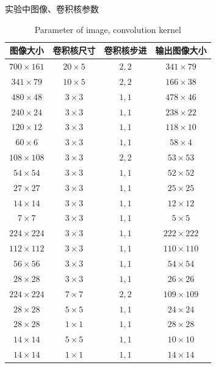 \begin{table}
	\centering
	\renewcommand{\thetable}{\arabic{section}-\arabic{table} }
	\renewcommand{\tablename}{表}
	\caption{实验中图像、卷积核参数}
	\addtocounter{table}{-1}
	\renewcommand{\thetable}{\arabic{section}-\arabic{table} }
	\renewcommand{\tablename}{Table}
	\caption{Parameter of image, convolution kernel}
	\begin{tabular}{cccc}
		\toprule
		图像大小 & 卷积核尺寸 & 卷积核步进 & 输出图像大小 \\
		\midrule
		$ 700\times 161 $ & $ 20\times 5 $ & $ 2,2 $ & $ 341\times 79 $ \\
		$ 341\times 79 $ & $ 10\times 5 $ & $ 2,2 $ & $ 166\times 38 $ \\
		$ 480\times 48 $ & $ 3\times 3 $ & $ 1,1 $ & $ 478\times 46 $ \\
		$ 240\times 24 $ & $ 3\times 3 $ & $ 1,1 $ & $ 238\times 22 $ \\
		$ 120\times 12 $ & $ 3\times 3 $ & $ 1,1 $ & $ 118\times 10 $ \\
		$ 60\times 6 $ & $ 3\times 3 $ & $ 1,1 $ & $ 58\times 4 $ \\
		$ 108\times 108 $ & $ 3\times 3 $ & $ 2,2 $ & $ 53\times 53 $ \\
		$ 54\times 54 $ & $ 3\times 3 $ & $ 1,1 $ & $ 52\times 52 $ \\
		$ 27\times 27 $ & $ 3\times 3 $ & $ 1,1 $ & $ 25\times 25 $ \\
		$ 14\times 14 $ & $ 3\times 3 $ & $ 1,1 $ & $ 12\times 12 $ \\
		$ 7\times 7 $ & $ 3\times 3 $ & $ 1,1 $ & $ 5\times 5 $ \\
		$ 224\times 224 $ & $ 3\times 3 $ & $ 1,1 $ & $ 222\times 222 $ \\
		$ 112\times 112 $ & $ 3\times 3 $ & $ 1,1 $ & $ 110\times 110 $ \\
		$ 56\times 56 $ & $ 3\times 3 $ & $ 1,1 $ & $ 54\times 54 $ \\
		$ 28\times 28 $ & $ 3\times 3 $ & $ 1,1 $ & $ 26\times 26 $ \\
		$ 224\times 224 $ & $ 7\times 7 $ & $ 2,2 $ & $ 109\times 109 $ \\
		$ 28\times 28 $ & $ 5\times 5 $ & $ 1,1 $ & $ 24\times 24 $ \\
		$ 28\times 28 $ & $ 1\times 1 $ & $ 1,1 $ & $ 28\times 28 $ \\
		$ 14\times 14 $ & $ 5\times 5 $ & $ 1,1 $ & $ 10\times 10 $ \\
		$ 14\times 14 $ & $ 1\times 1 $ & $ 1,1 $ & $ 14\times 14 $ \\

\end{tabular}
\end{table}
